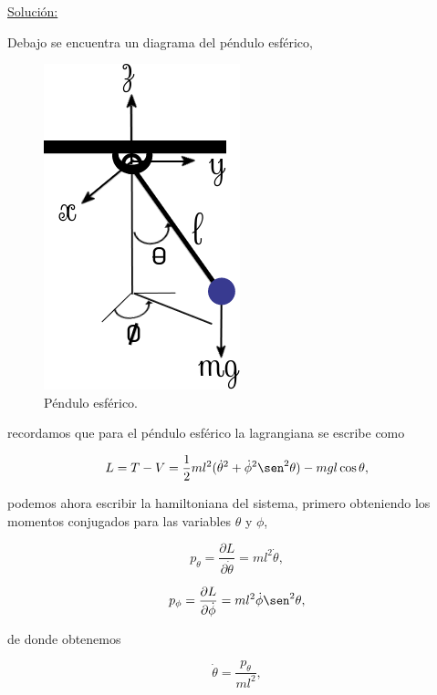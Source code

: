 \documentclass[a4paper,10pt]{article}
\numberwithin{equation}{section}
\begin{document}
\vspace{.3cm}

\underline{Solución:} \vspace{.3cm}

Debajo se encuentra un diagrama del péndulo esférico,

\begin{figure}[H]
 \center 
 \includegraphics[scale=0.6]{problema5fig1}
 \caption{Péndulo esférico.}
 \label{fig:problema5fig1}
\end{figure}

recordamos que para el péndulo esférico la lagrangiana se escribe como 

\begin{equation}
 L = T - V = \frac{1}{2}ml^2(\dot{\theta}^2 + \dot{\phi}^2\sen^2{\theta}) 
 - mgl\cos{\theta},
\end{equation}

podemos ahora escribir la hamiltoniana del sistema, primero obteniendo los momentos 
conjugados para las variables $\theta$ y $\phi$, 

\begin{equation}
 p_\theta = \frac{\partial L}{\partial \dot{\theta}} = ml^2\dot{\theta},
\end{equation}

\begin{equation}
 p_\phi = \frac{\partial L}{\partial \dot{\phi}} = ml^2\dot{\phi}\sen^2{\theta},
\end{equation}

de donde obtenemos 

\begin{equation}
 \dot{\theta} = \frac{p_\theta}{ml^2},
\end{equation}
\end{document}
